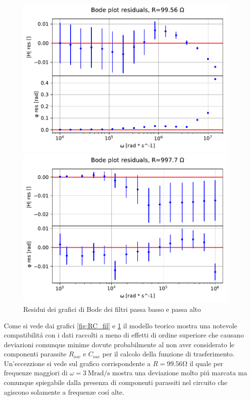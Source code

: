 \documentclass{article}
\begin{document}
\begin{figure}[H]
\begin{minipage}{0.5\textwidth}
        \includegraphics[width=\textwidth]{bodeplot_res3.pdf} 
    \end{minipage}\hfill
    \begin{minipage}{0.5\textwidth}
        \centering
        \includegraphics[width=\textwidth]{bodeplot_res4.pdf} 
    \end{minipage}
    \caption{Residui dei grafici di Bode dei filtri passa basso e passa alto}
    \label{fig:RC_fil_res}
\end{figure}

Come si vede dai grafici \ref{fig:RC_fil} e \ref{fig:RC_fil_res} il modello teorico mostra una notevole compatibilit\'a con i dati raccolti a meno di effetti di ordine superiore che causano deviazioni comunque minime dovute probabilmente al non aver considerato le componenti parassite $R_{osc}$ e $C_{osc}$ per il calcolo della funzione di trasferimento. Un'eccezzione si vede sul grafico corrispondente a $R=99.56 \si{\ohm}$ il quale per frequenze maggiori di $\omega = 3\ \si{\mega\radian\per\second}$ mostra una deviazione molto pi\'u marcata ma comunque spiegabile dalla presenza di componenti parassiti nel circuito che agiscono solamente a frequenze cos\'i alte.
\end{document}
